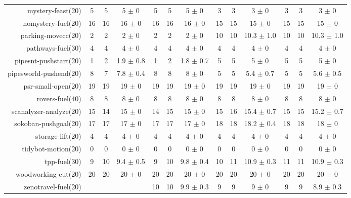 \begin{center}
\begin{tabular}{|r|*{4}{ccc|}}
mystery-feast(20) & 5 & 5 & 5 \(\pm\) 0 & 5 & 5 & 5 \(\pm\) 0 & 3 & 3 & 3 \(\pm\) 0 & 3 & 3 & 3 \(\pm\) 0\\
nomystery-fuel(20) & 16 & 16 & 16 \(\pm\) 0 & 16 & 16 & 16 \(\pm\) 0 & 15 & 15 & 15 \(\pm\) 0 & 15 & 15 & 15 \(\pm\) 0\\
parking-movecc(20) & 2 & 2 & 2 \(\pm\) 0 & 2 & 2 & 2 \(\pm\) 0 & 10 & 10 & 10.3 \(\pm\) 1.0 & 10 & 10 & 10.3 \(\pm\) 1.0\\
pathways-fuel(30) & 4 & 4 & 4 \(\pm\) 0 & 4 & 4 & 4 \(\pm\) 0 & 4 & 4 & 4 \(\pm\) 0 & 4 & 4 & 4 \(\pm\) 0\\
pipesnt-pushstart(20) & 1 & 2 & 1.9 \(\pm\) 0.8 & 1 & 2 & 1.8 \(\pm\) 0.7 & 5 & 5 & 5 \(\pm\) 0 & 5 & 5 & 5 \(\pm\) 0\\
pipesworld-pushend(20) & 8 & 7 & 7.8 \(\pm\) 0.4 & 8 & 8 & 8 \(\pm\) 0 & 5 & 5 & 5.4 \(\pm\) 0.7 & 5 & 5 & 5.6 \(\pm\) 0.5\\
psr-small-open(20) & 19 & 19 & 19 \(\pm\) 0 & 19 & 19 & 19 \(\pm\) 0 & 19 & 19 & 19 \(\pm\) 0 & 19 & 19 & 19 \(\pm\) 0\\
rovers-fuel(40) & 8 & 8 & 8 \(\pm\) 0 & 8 & 8 & 8 \(\pm\) 0 & 8 & 8 & 8 \(\pm\) 0 & 8 & 8 & 8 \(\pm\) 0\\
scanalyzer-analyze(20) & 15 & 14 & 15 \(\pm\) 0 & 14 & 15 & 15 \(\pm\) 0 & 15 & 16 & 15.4 \(\pm\) 0.7 & 15 & 15 & 15.2 \(\pm\) 0.7\\
sokoban-pushgoal(20) & 17 & 17 & 17 \(\pm\) 0 & 17 & 17 & 17 \(\pm\) 0 & 18 & 18 & 18.2 \(\pm\) 0.4 & 18 & 18 & 18 \(\pm\) 0\\
storage-lift(20) & 4 & 4 & 4 \(\pm\) 0 & 4 & 4 & 4 \(\pm\) 0 & 4 & 4 & 4 \(\pm\) 0 & 4 & 4 & 4 \(\pm\) 0\\
tidybot-motion(20) & 0 & 0 & 0 \(\pm\) 0 & 0 & 0 & 0 \(\pm\) 0 & 0 & 0 & 0 \(\pm\) 0 & 0 & 0 & 0 \(\pm\) 0\\
tpp-fuel(30) & 9 & 10 & 9.4 \(\pm\) 0.5 & 9 & 10 & 9.8 \(\pm\) 0.4 & 10 & 11 & 10.9 \(\pm\) 0.3 & 11 & 11 & 10.9 \(\pm\) 0.3\\
woodworking-cut(20) & 20 & 20 & 20 \(\pm\) 0 & 20 & 20 & 20 \(\pm\) 0 & 20 & 20 & 20 \(\pm\) 0 & 20 & 20 & 20 \(\pm\) 0\\
zenotravel-fuel(20) &  &  &  & 10 & 10 & 9.9 \(\pm\) 0.3 & 9 & 9 & 9 \(\pm\) 0 & 9 & 9 & 8.9 \(\pm\) 0.3\\
\end{tabular}
\end{center}
